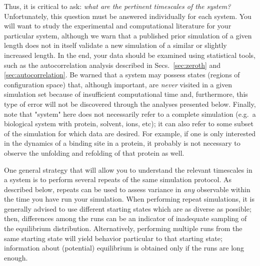 Thus, it is critical to ask: \emph{what are the pertinent timescales of the system?} 
Unfortunately, this question must be answered individually for each system.  You will want to study the experimental and computational literature for your particular system, although we warn that a published prior simulation of a given length does not in itself validate a new simulation of a similar or slightly increased length.  In the end, your data should be examined using statistical tools, such as the autocorrelation analysis described in Secs.~\ref{sec:zeroth} and \ref{sec:autocorrelation}.  Be warned that a system may possess states (regions of configuration space) that, although important, are \emph{never} visited in a given simulation set because of insufficient computational time \cite{Grossfield2009} and, furthermore, this type of error will not be discovered through the analyses presented below.
Finally, note that "system" here does not necessarily refer to a complete simulation (e.g.~a biological system with protein, solvent, ions, etc); it can also refer to some subset of the simulation for which data are desired.  For example, if one is only interested in the dynamics of a binding site in a protein, it probably is not necessary to observe the unfolding and refolding of that protein as well.

One general strategy that will allow you to understand the relevant timescales in a system is to perform several repeats of the same simulation protocol.  As described below, repeats can be used to assess variance in \emph{any} observable within the time you have run your simulation.
When performing repeat simulations, it is generally advised to use different starting states which are as diverse as possible; then, differences among the runs can be an indicator of inadequate sampling of the equilibrium distribution.
Alternatively, performing multiple runs from the same starting state will yield behavior particular to that starting state; information about (potential) equilibrium is obtained only if the runs are long enough.

